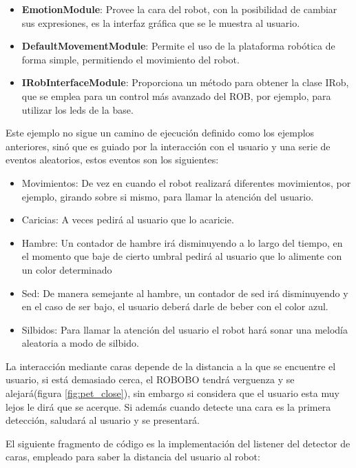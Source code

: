 \begin{itemize}
	\item \textbf{EmotionModule}: Provee la cara del robot, con la posibilidad de cambiar sus expresiones, es la interfaz gráfica que se le muestra al usuario.
	\item \textbf{DefaultMovementModule}: Permite el uso de la plataforma robótica de forma simple, permitiendo el movimiento del robot.
	\item \textbf{IRobInterfaceModule}: Proporciona un método para obtener la clase IRob, que se emplea para un control más avanzado del ROB, por ejemplo, para utilizar los leds de la base.
\end{itemize}


Este ejemplo no sigue un camino de ejecución definido como los ejemplos anteriores, sinó que es guiado por la interacción con el usuario y una serie de eventos aleatorios, estos eventos son los siguientes:

\begin{itemize}
	\item Movimientos: De vez en cuando el robot realizará diferentes movimientos, por ejemplo, girando sobre si mismo, para llamar la atención del usuario.
	\item Caricias: A veces pedirá al usuario que lo acaricie.
	\item Hambre: Un contador de hambre irá disminuyendo a lo largo del tiempo, en el momento que baje de cierto umbral pedirá al usuario que lo alimente con un color determinado
	\item Sed: De manera semejante al hambre, un  contador de sed irá disminuyendo y en el caso de ser bajo, el usuario deberá darle de beber con el color azul.
	\item Silbidos: Para llamar la atención del usuario el robot hará sonar una melodía aleatoria a modo de silbido.
\end{itemize}

La interacción mediante caras depende de la distancia a la que se encuentre el usuario, si está demasiado cerca, el ROBOBO tendrá verguenza y se alejará(figura \ref{fig:pet_close}), sin embargo si considera que el usuario esta muy lejos le dirá que se acerque. Si además cuando detecte una cara es la primera detección, saludará al usuario y se presentará.

El siguiente fragmento de código es la implementación del listener del detector de caras, empleado para saber la distancia del usuario al robot:

